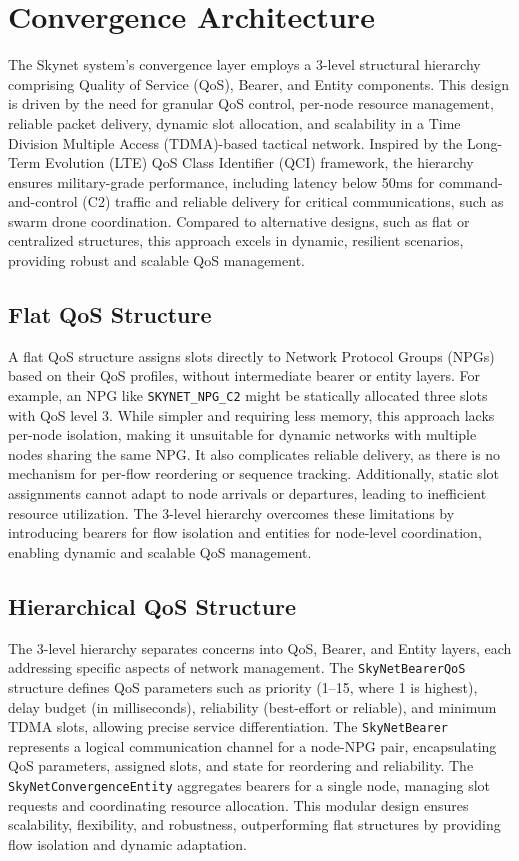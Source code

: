 \documentclass{article}
\begin{document}
\section{Convergence Architecture}
The Skynet system's convergence layer employs a 3-level structural hierarchy comprising Quality of
Service (QoS), Bearer, and Entity components. This design is driven by the need for granular QoS
control, per-node resource management, reliable packet delivery, dynamic slot allocation, and
scalability in a Time Division Multiple Access (TDMA)-based tactical network. Inspired by the
Long-Term Evolution (LTE) QoS Class Identifier (QCI) framework, the hierarchy ensures military-grade
performance, including latency below 50ms for command-and-control (C2) traffic and reliable delivery
for critical communications, such as swarm drone coordination. Compared to alternative designs, such
as flat or centralized structures, this approach excels in dynamic, resilient scenarios, providing
robust and scalable QoS management.

\subsection{Flat QoS Structure}
A flat QoS structure assigns slots directly to Network Protocol Groups (NPGs) based on their QoS
profiles, without intermediate bearer or entity layers. For example, an NPG like
\texttt{SKYNET\_NPG\_C2} might be statically allocated three slots with QoS level 3. While simpler
and requiring less memory, this approach lacks per-node isolation, making it unsuitable for dynamic
networks with multiple nodes sharing the same NPG. It also complicates reliable delivery, as there is
no mechanism for per-flow reordering or sequence tracking. Additionally, static slot assignments
cannot adapt to node arrivals or departures, leading to inefficient resource utilization. The 3-level
hierarchy overcomes these limitations by introducing bearers for flow isolation and entities for
node-level coordination, enabling dynamic and scalable QoS management.

\subsection{Hierarchical QoS Structure}
The 3-level hierarchy separates concerns into QoS, Bearer, and Entity layers, each addressing
specific aspects of network management. The \texttt{SkyNetBearerQoS} structure defines QoS
parameters such as priority (1--15, where 1 is highest), delay budget (in milliseconds), reliability
(best-effort or reliable), and minimum TDMA slots, allowing precise service differentiation. The
\texttt{SkyNetBearer} represents a logical communication channel for a node-NPG pair, encapsulating
QoS parameters, assigned slots, and state for reordering and reliability. The
\texttt{SkyNetConvergenceEntity} aggregates bearers for a single node, managing slot requests and
coordinating resource allocation. This modular design ensures scalability, flexibility, and
robustness, outperforming flat structures by providing flow isolation and dynamic adaptation.
\end{document}

